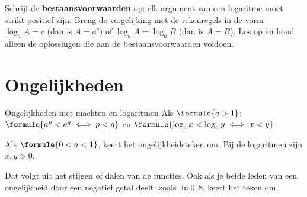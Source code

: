 \begin{oefeningen}
\end{oefeningen}


\begin{werkwijze}
Schrijf de \textbf{bestaansvoorwaarden} op: elk argument van een logaritme moet strikt positief zijn. Breng de vergelijking met de rekenregels in de vorm $\log_a A = c$ (dan is $A = a^c$) of $\log_a A = \log_a B$ (dan is $A = B$). Los op en houd alleen de oplossingen die aan de bestaansvoorwaarden voldoen.
\end{werkwijze}

\begin{oefeningen}

\end{oefeningen}

\section{Ongelijkheden}

\begin{theorie}
\begin{stelling}{Ongelijkheden met machten en logaritmen}
Als $\formule{a > 1}$: \qquad $\formule{a^p < a^q \iff p < q}$ \qquad en \qquad $\formule{\log_a x < \log_a y \iff x < y}$.

Als $\formule{0 < a < 1}$, keert het ongelijkheidsteken om. Bij de logaritmen zijn $x, y > 0$.
\end{stelling}
\end{theorie}

Dat volgt uit het stijgen of dalen van de functies. Ook als je beide leden van een ongelijkheid door een negatief getal deelt, zoals $\ln 0{,}8$, keert het teken om.

